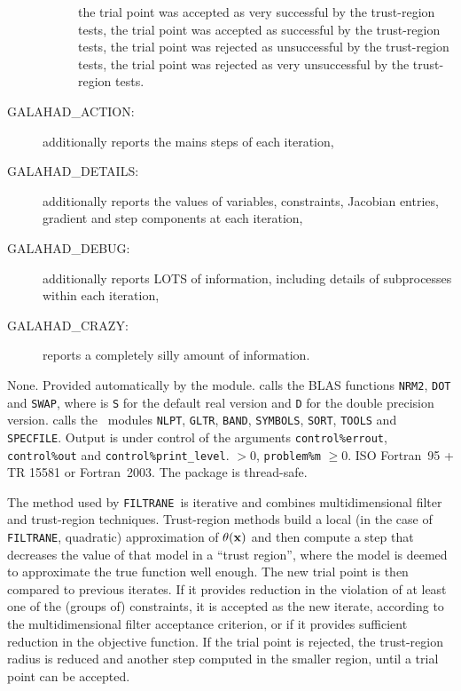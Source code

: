 \documentclass{galahad}
\newcommand{\packagename}{FILTRANE}
\newcommand{\sym}{\sf\small}
\newcommand{\filtrane}{{\tt \packagename}}
\begin{document}
\begin{description}
\begin{description}
 the trial point was accepted as very successful by the trust-region
tests,
 the trial point was accepted as successful by the trust-region
tests,
 the trial point was rejected as unsuccessful by the trust-region
tests,
 the trial point was rejected as very unsuccessful by the
trust-region tests.
\end{description}
\item[\sym GALAHAD\_ACTION:] additionally reports the mains steps of each
iteration,
\item[\sym GALAHAD\_DETAILS:] additionally reports the values of variables,
constraints,  Jacobian entries, gradient and step components at each
iteration,
\item[\sym GALAHAD\_DEBUG:] additionally reports LOTS of information,
including details of subprocesses within each iteration,
\item[\sym GALAHAD\_CRAZY:] reports a completely silly amount of information.
\end{description}


\galgeneral

\galcommon None.
\galworkspace Provided automatically by the module.
\galroutines {\tt \packagename\_solve} calls the BLAS functions {\tt *NRM2},
{\tt *DOT} and {\tt *SWAP}, where {\tt *} is {\tt S} for 
the default real version and {\tt D} for the double precision version.
\galmodules {\tt \packagename} calls the \galahad\ modules
{\tt NLPT}, {\tt GLTR}, {\tt BAND}, {\tt SYMBOLS}, {\tt SORT}, {\tt TOOLS} and
{\tt SPECFILE}. 
\galio Output is under control of the arguments
 {\tt control\%errout}, {\tt control\%out} and {\tt control\%print\_level}.
 $> 0$, 
{\tt problem\%m} $\geq  0$.
\galportability ISO Fortran~95 + TR 15581 or Fortran~2003. 
The package is thread-safe.


\galmethod

The method used by \filtrane\ is iterative and combines multidimensional
filter and trust-region techniques.  Trust-region methods 
build a local (in the case of \filtrane , quadratic) approximation of
$\theta({\mathbf{x}})$ and then compute a step that decreases the value of that model
in a ``trust region'', where the model is deemed to approximate the true
function well enough. The new trial point is then compared to previous
iterates. If it provides reduction in the violation of at least one of the
(groups of) constraints, it is accepted as the new iterate, according to the
multidimensional filter acceptance criterion, or if it provides sufficient
reduction in the objective function. If the trial point is rejected,
the trust-region radius is reduced and another step computed in the smaller
region, until a trial point can be accepted.
\end{document}
